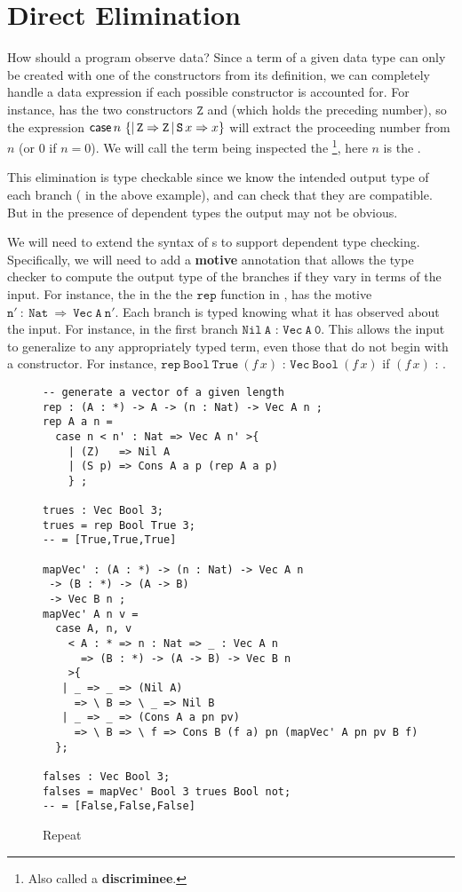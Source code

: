 \section{Direct Elimination}

How should a program observe data?
Since a term of a given data type can only be created with one of the constructors from its definition, we can completely handle a data expression if each possible constructor is accounted for.
For instance, \Nat{} has the two constructors $\mathtt{Z}$ and \Suc{} (which holds the preceding number), so the expression $\mathsf{case}{}\,n\,\left\{ |\,\mathtt{Z}\Rightarrow \mathtt{Z}\,|\,\mathtt{S}{}\,x\Rightarrow x\right\}$ will extract the proceeding number from $n$ (or $0$ if $n=0$).
We will call the term being inspected the \textbf{\scrut{}}\footnote{
  Also called a \textbf{discriminee}.
}, here $n$ is the \scrut{}.
 
This \Nat{} elimination is type checkable since we know the intended output type of each branch (\Nat{} in the above example), and can check that they are compatible.
But in the presence of dependent types the output may not be obvious.

We will need to extend the syntax of \case{}s to support dependent type checking.
Specifically, we will need to add a \textbf{motive} annotation that allows the type checker to compute the output type of the branches if they vary in terms of the input.
For instance, the \case{} in the the $\mathtt{rep}$ function in , has the motive $\mathtt{n'\ :\ Nat\ \Rightarrow\ Vec\ A\ n'}$.
Each branch is typed knowing what it has observed about the input.
For instance, in the first branch $\mathtt{Nil\ A}$ :  $\mathtt{Vec\ A\ 0}$.
This allows the input to generalize to any appropriately typed term, even those that do not begin with a constructor.
For instance, $\mathtt{rep\ Bool\ True\ }(f\,x)$ : $\mathtt{Vec\ Bool\ }(f\,x)$ if $(f\,x)$ : \Nat{}.

\begin{figure}
\begin{lstlisting}[basicstyle={\ttfamily\small}]
-- generate a vector of a given length
rep : (A : *) -> A -> (n : Nat) -> Vec A n ;
rep A a n = 
  case n < n' : Nat => Vec A n' >{
    | (Z)   => Nil A
    | (S p) => Cons A a p (rep A a p)
    } ;

trues : Vec Bool 3;
trues = rep Bool True 3;
-- = [True,True,True]

mapVec' : (A : *) -> (n : Nat) -> Vec A n 
 -> (B : *) -> (A -> B)
 -> Vec B n ;
mapVec' A n v =
  case A, n, v 
    < A : * => n : Nat => _ : Vec A n 
      => (B : *) -> (A -> B) -> Vec B n 
    >{
   | _ => _ => (Nil A)          
     => \ B => \ _ => Nil B
   | _ => _ => (Cons A a pn pv) 
     => \ B => \ f => Cons B (f a) pn (mapVec' A pn pv B f)
  };

falses : Vec Bool 3;
falses = mapVec' Bool 3 trues Bool not;
-- = [False,False,False]
\end{lstlisting}
\caption{Repeat}
\label{fig:data-elim-examples}
\end{figure}

